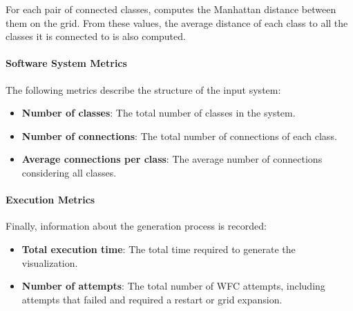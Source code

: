 \documentclass[../../main.tex]{subfiles}
\begin{document}
For each pair of connected classes, \wassis computes the Manhattan distance between them on the grid. From these values, the average distance of each class to all the classes it is connected to is also computed.

\paragraph{Software System Metrics}

The following metrics describe the structure of the input system:

\begin{itemize}
    \item \textbf{Number of classes}: The total number of classes in the system.
    \item \textbf{Number of connections}: The total number of connections of each class.
    \item \textbf{Average connections per class}: The average number of connections considering all classes.
\end{itemize}

\paragraph{Execution Metrics}

Finally, information about the generation process is recorded:

\begin{itemize}
    \item \textbf{Total execution time}: The total time required to generate the visualization.
    \item \textbf{Number of attempts}: The total number of WFC attempts, including attempts that failed and required a restart or grid expansion.
\end{itemize}
\end{document}
